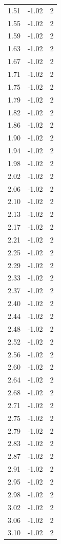\begin{longtable}{lrr}
  1.51 & -1.02 & 2 \\
  1.55 & -1.02 & 2 \\
  1.59 & -1.02 & 2 \\
  1.63 & -1.02 & 2 \\
  1.67 & -1.02 & 2 \\
  1.71 & -1.02 & 2 \\
  1.75 & -1.02 & 2 \\
  1.79 & -1.02 & 2 \\
  1.82 & -1.02 & 2 \\
  1.86 & -1.02 & 2 \\
  1.90 & -1.02 & 2 \\
  1.94 & -1.02 & 2 \\
  1.98 & -1.02 & 2 \\
  2.02 & -1.02 & 2 \\
  2.06 & -1.02 & 2 \\
  2.10 & -1.02 & 2 \\
  2.13 & -1.02 & 2 \\
  2.17 & -1.02 & 2 \\
  2.21 & -1.02 & 2 \\
  2.25 & -1.02 & 2 \\
  2.29 & -1.02 & 2 \\
  2.33 & -1.02 & 2 \\
  2.37 & -1.02 & 2 \\
  2.40 & -1.02 & 2 \\
  2.44 & -1.02 & 2 \\
  2.48 & -1.02 & 2 \\
  2.52 & -1.02 & 2 \\
  2.56 & -1.02 & 2 \\
  2.60 & -1.02 & 2 \\
  2.64 & -1.02 & 2 \\
  2.68 & -1.02 & 2 \\
  2.71 & -1.02 & 2 \\
  2.75 & -1.02 & 2 \\
  2.79 & -1.02 & 2 \\
  2.83 & -1.02 & 2 \\
  2.87 & -1.02 & 2 \\
  2.91 & -1.02 & 2 \\
  2.95 & -1.02 & 2 \\
  2.98 & -1.02 & 2 \\
  3.02 & -1.02 & 2 \\
  3.06 & -1.02 & 2 \\
  3.10 & -1.02 & 2 \\

\end{longtable}
